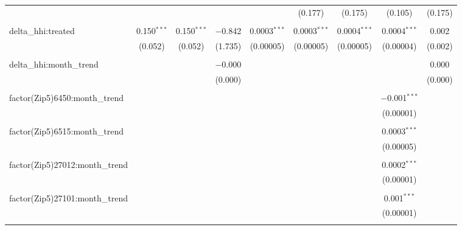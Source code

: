 \begin{table}[H]
{\begin{tabular}{@{\extracolsep{5pt}}lcccccccc}
   &  &  &  &  & (0.177) & (0.175) & (0.105) & (0.175) \\  

   & & & & & & & & \\  

  delta\_hhi:treated & 0.150$^{***}$ & 0.150$^{***}$ & $-$0.842 & 0.0003$^{***}$ & 0.0003$^{***}$ & 0.0004$^{***}$ & 0.0004$^{***}$ & 0.002 \\  

   & (0.052) & (0.052) & (1.735) & (0.00005) & (0.00005) & (0.00005) & (0.00004) & (0.002) \\  

   & & & & & & & & \\  

  delta\_hhi:month\_trend &  &  & $-$0.000 &  &  &  &  & 0.000 \\  

   &  &  & (0.000) &  &  &  &  & (0.000) \\  

   & & & & & & & & \\  

  factor(Zip5)6450:month\_trend &  &  &  &  &  &  & $-$0.001$^{***}$ &  \\  

   &  &  &  &  &  &  & (0.00001) &  \\  

   & & & & & & & & \\  

  factor(Zip5)6515:month\_trend &  &  &  &  &  &  & 0.0003$^{***}$ &  \\  

   &  &  &  &  &  &  & (0.00005) &  \\  

   & & & & & & & & \\  

  factor(Zip5)27012:month\_trend &  &  &  &  &  &  & 0.0002$^{***}$ &  \\  

   &  &  &  &  &  &  & (0.00001) &  \\  

   & & & & & & & & \\  

  factor(Zip5)27101:month\_trend &  &  &  &  &  &  & 0.001$^{***}$ &  \\  

   &  &  &  &  &  &  & (0.00001) &  \\  

   & & & & & & & & \\  


\end{tabular}}
\end{table}
